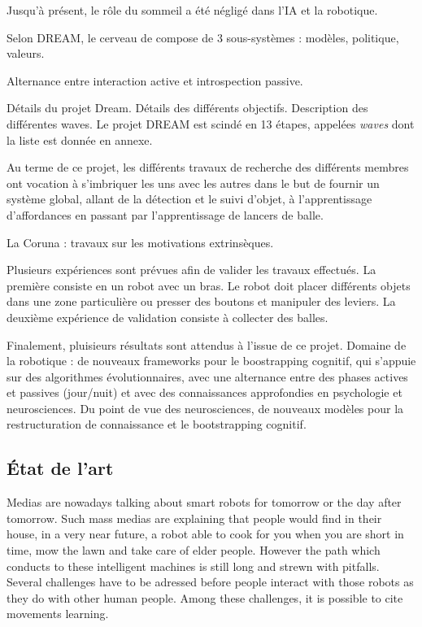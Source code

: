 \documentclass{llncs}
\begin{document}
Jusqu'à présent, le rôle du sommeil a été négligé dans l'IA et la robotique.

Selon DREAM, le cerveau de compose de 3 sous-systèmes : modèles, politique, valeurs.

Alternance entre interaction active et introspection passive.

Détails du projet Dream.
Détails des différents objectifs.
Description des différentes waves.
Le projet DREAM est scindé en 13 étapes, appelées \textit{waves} dont la liste est donnée en annexe. 

Au terme de ce projet, les différents travaux de recherche des différents membres ont vocation à s'imbriquer les uns avec les autres dans le but de fournir un système global, allant de la détection et le suivi d'objet, à l'apprentissage d'affordances en passant par l'apprentissage de lancers de balle.

La Coruna : travaux sur les motivations extrinsèques.

Plusieurs expériences sont prévues afin de valider les travaux effectués. La première consiste en un robot avec un bras. Le robot doit placer différents objets dans une zone particulière ou presser des boutons et manipuler des leviers. La deuxième expérience de validation consiste à collecter des balles.

Finalement, pluisieurs résultats sont attendus à l'issue de ce projet. Domaine de la robotique : de nouveaux frameworks pour le boostrapping cognitif, qui s'appuie sur des algorithmes évolutionnaires, avec une alternance entre des phases actives et passives (jour/nuit) et avec des connaissances approfondies en psychologie et neurosciences. Du point de vue des neurosciences, de nouveaux modèles pour la restructuration de connaissance et le bootstrapping cognitif.

\subsection{\'Etat de l'art}

Medias are nowadays talking about smart robots for tomorrow or the day after tomorrow. Such mass medias are explaining that people would find in their house, in a very near future,  a robot able to cook for you when you are short in time, mow the lawn and take care of elder people. However the path which conducts to these intelligent machines is still long and strewn with pitfalls. Several challenges have to be adressed before people interact with those robots as they do with other human people. Among these challenges, it is possible to cite movements learning.
\end{document}
